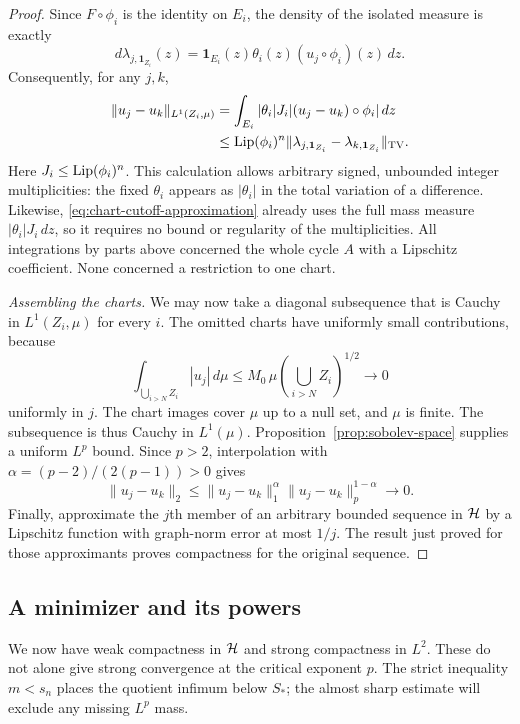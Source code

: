 \begin{proof}
Since $F\circ\phi_i$ is the identity on $E_i$, the density of the
isolated measure is exactly
\[
 d\lambda_{j,\mathbf1_{Z_i}}(z)
   =\mathbf1_{E_i}(z)\theta_i(z)(u_j\circ\phi_i)(z)\,dz.
\]
Consequently, for any $j,k$,
\begin{align*}
 \|u_j-u_k\|_{L^1(Z_i,\mu)}
 &=\int_{E_i}|\theta_i|J_i
                  |(u_j-u_k)\circ\phi_i|\,dz\\
 &\le\operatorname{Lip}(\phi_i)^n
          \|\lambda_{j,\mathbf1_{Z_i}}
                    -\lambda_{k,\mathbf1_{Z_i}}\|_{\mathrm{TV}}.
\end{align*}
Here $J_i\le\operatorname{Lip}(\phi_i)^n$.  This calculation allows arbitrary
signed, unbounded integer multiplicities: the fixed $\theta_i$
appears as $|\theta_i|$ in the total variation of a difference.
Likewise, \eqref{eq:chart-cutoff-approximation} already uses the full
mass measure $|\theta_i|J_i\,dz$, so it requires no bound or regularity
of the multiplicities.  All integrations by parts above concerned
the whole cycle $A$ with a Lipschitz coefficient.  None concerned a
restriction to one chart.

\emph{Assembling the charts.}
We may now take a diagonal subsequence that is Cauchy in
$L^1(Z_i,\mu)$ for every $i$.  The omitted charts have uniformly
small contributions, because
\[
 \int_{\bigcup_{i>N}Z_i}|u_j|\,d\mu
 \le M_0\,\mu\left(\bigcup_{i>N}Z_i\right)^{1/2}
 \longrightarrow0
\]
uniformly in $j$.  The chart images cover $\mu$ up to a null set,
and $\mu$ is finite.  The subsequence is thus Cauchy in $L^1(\mu)$.
Proposition~\ref{prop:sobolev-space} supplies a uniform $L^p$ bound.
Since $p>2$, interpolation with
$\alpha=(p-2)/(2(p-1))>0$ gives
\[
 \|u_j-u_k\|_2
 \le\|u_j-u_k\|_1^\alpha\|u_j-u_k\|_p^{1-\alpha}
 \longrightarrow0.
\]
Finally, approximate the $j$th member of an arbitrary bounded
sequence in $\mathcal H$ by a Lipschitz function with graph-norm error
at most $1/j$.  The result just proved for those approximants proves
compactness for the original sequence.
\end{proof}

\subsection{A minimizer and its powers}

We now have weak compactness in $\mathcal H$ and strong compactness in
$L^2$. These do not alone give strong convergence at the critical
exponent $p$. The strict inequality $m<s_n$ places the quotient
infimum below $S_*$; the almost sharp estimate will exclude any missing
$L^p$ mass.

